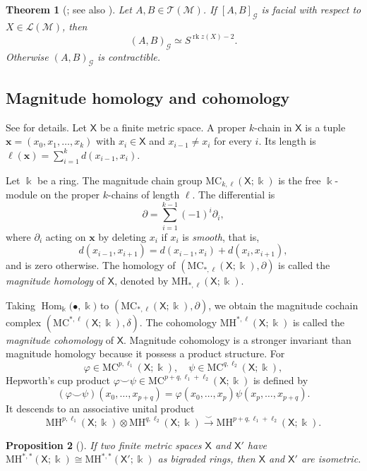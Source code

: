 \documentclass[10pt]{amsart}
\theoremstyle{plain}
\newtheorem{theorem}{Theorem}[section]
\newtheorem{proposition}[theorem]{Proposition}
\theoremstyle{definition}
\newcommand{\T}{\mathcal{T}}
\newcommand{\G}{\mathcal{G}}
\newcommand{\MC}{\mathrm{MC}}
\newcommand{\MH}{\mathrm{MH}}
\newcommand{\M}{\mathcal{M}}
\newcommand{\X}{\mathsf{X}}
\newcommand{\Lcov}{\mathcal{L}}
\newcommand{\rk}{\operatorname{rk}}
\newcommand{\Hom}{\operatorname{Hom}}
\newcommand{\kk}{\Bbbk}
\begin{document}
\begin{theorem}[{\cite[Theorem 2.2]{Edelman1985}; see also \cite[Theorem 4.4.2]{Bjorner1999}}]\label{thm:EW}
Let $A,B\in\T(\M)$. If $[A,B]_{\G}$ is facial with respect to $X\in\Lcov(\M)$, then
\[
(A,B)_{\G}\simeq S^{\rk z(X)-2}.
\]
Otherwise $(A,B)_{\G}$ is contractible.
\end{theorem}



\subsection{Magnitude homology and cohomology}
See \cite{Hepworth2017,Hepworth2022} for details. Let $\X$ be a finite metric space. A proper $k$-chain in $\X$ is a tuple $\boldsymbol{x}=(x_0,x_1,\ldots,x_k)$ with $x_i\in \X$ and $x_{i-1}\neq x_i$ for every $i$. Its length is $\ell(\boldsymbol{x})=\sum_{i=1}^k d(x_{i-1},x_i)$.

Let $\kk$ be a ring. The magnitude chain group $\MC_{k,\ell}(\X;\kk)$ is the free $\kk$-module on the proper $k$-chains of length $\ell$. The differential is
\[
\partial=\sum_{i=1}^{k-1}(-1)^i\partial_i,
\]
where $\partial_i$ acting on $\boldsymbol{x}$ by deleting $x_i$ if $x_i$ is \emph{smooth}, that is,
\[
d(x_{i-1},x_{i+1})=d(x_{i-1},x_i)+d(x_i,x_{i+1}),
\]
and is zero otherwise. The homology of $(\MC_{*,\ell}(\X;\kk),\partial)$ is called the \emph{magnitude homology} of $\X$, denoted by $\MH_{*,\ell}(\X;\kk)$.

Taking $\Hom_\kk\bigl(\bullet,\kk\bigr)$ to $(\MC_{*,\ell}(\X;\kk),\partial)$, we obtain the magnitude cochain complex $(\MC^{*,\ell}(\X;\kk),\delta)$. The cohomology $\MH^{*,\ell}(\X;\kk)$ is called the \emph{magnitude cohomology} of $\X$. Magnitude cohomology is a stronger invariant than magnitude homology because it possess a product structure. For
\[
\varphi\in\MC^{p,\ell_1}(\X;\kk),\quad \psi\in\MC^{q,\ell_2}(\X;\kk),
\]
Hepworth's cup product $\varphi\smile\psi\in\MC^{p+q,\ell_1+\ell_2}(\X;\kk)$ is defined by
\begin{equation}\label{cup-chain}
(\varphi\smile\psi)(x_0,\ldots,x_{p+q})=\varphi(x_0,\ldots,x_p)\psi(x_p,\ldots,x_{p+q}).
\end{equation}
It descends to an associative unital product
\[
\MH^{p,\ell_1}(\X;\kk)\otimes\MH^{q,\ell_2}(\X;\kk)\xrightarrow{\smile}\MH^{p+q,\ell_1+\ell_2}(\X;\kk).
\]

\begin{proposition}[{\cite[Corollary 3.2]{Hepworth2022}}]\label{magcoh-is-complete}
If two finite metric spaces $\X$ and $\X'$ have $\MH^{*,*}(\X;\kk)\cong\MH^{*,*}(\X';\kk)$ as bigraded rings, then $\X$ and $\X'$ are isometric.
\end{proposition}
\end{document}
